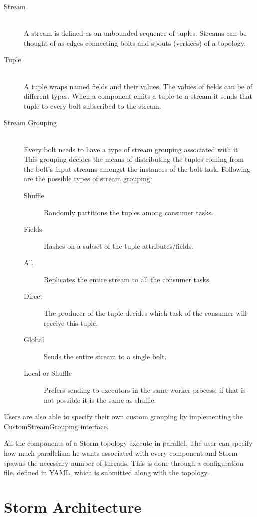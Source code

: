 \documentclass[bsc,logo,frontabs,twoside,singlespacing,normalheadings,parskip]{infthesis}     %
\let\Oldtodo\todo
\renewcommand{\todo}[1]{\Oldtodo[inline]{#1}}
\begin{document}
\begin{description}
  \item[Stream] \hfill \\
  A stream is defined as an unbounded sequence of tuples. Streams can be thought of as edges connecting bolts and spouts (vertices) of a topology.
  \item[Tuple] \hfill \\
  A tuple wraps named fields and their values. The values of fields can be of different types. When a component emits a tuple to a stream it sends that tuple to every bolt subscribed to the stream.
  \item[Stream Grouping] \hfill \\
  Every bolt needs to have a type of stream grouping associated with it. This grouping decides the means of distributing the tuples coming from the bolt's input streams amongst the instances of the bolt task. Following are the possible types of stream grouping:
  \begin{description}
  	\item[Shuffle] Randomly partitions the tuples among consumer tasks.
  	\item[Fields] Hashes on a subset of the tuple attributes/fields.
  	\item[All] Replicates the entire stream to all the consumer tasks.
  	\item[Direct] The producer of the tuple decides which task of the consumer will receive this tuple.
  	\item[Global] Sends the entire stream to a single bolt.
  	\item[Local or Shuffle] Prefers sending to executors in the same worker process, if that is not possible it is the same as shuffle.
  \end{description}
\end{description}

Users are also able to specify their own custom grouping by implementing the CustomStreamGrouping interface.

\todo{Explain why you would want to do that.}

All the components of a Storm topology execute in parallel. The user can specify how much parallelism he wants associated with every component and Storm spawns the necessary number of threads. This is done through a configuration file, defined in YAML, which is submitted along with the topology.

\section{Storm Architecture}
\end{document}
